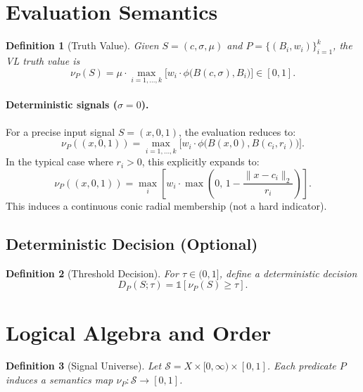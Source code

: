 \documentclass[11pt]{article}
\newtheorem{definition}{Definition}
\newcommand{\bbone}{\mathbb{1}}
\begin{document}
\section{Evaluation Semantics}

\begin{definition}[Truth Value]
Given $S=(c,\sigma,\mu)$ and $P=\{(B_i,w_i)\}_{i=1}^{k}$, the VL truth value is
\begin{equation}
\nu_P(S)=\mu\cdot \max_{i=1,\dots,k}\Big[w_i\cdot \phi\big(B(c,\sigma),B_i\big)\Big]\in[0,1].
\end{equation}
\end{definition}

\paragraph{Deterministic signals ($\sigma=0$).}
For a precise input signal $S=(x,0,1)$, the evaluation reduces to:
\begin{equation}
\nu_P((x,0,1))= \max_{i=1,\dots,k}\Big[w_i\cdot \phi\big(B(x,0), B(c_i, r_i)\big)\Big].
\end{equation}
In the typical case where $r_i > 0$, this explicitly expands to:
\begin{equation}
\nu_P((x,0,1))=\max_{i}\left[w_i\cdot \max\!\left(0,\,1-\frac{\|x-c_i\|_2}{r_i}\right)\right].
\end{equation}
This induces a continuous conic radial membership (not a hard indicator).

\subsection{Deterministic Decision (Optional)}
\begin{definition}[Threshold Decision]
For $\tau\in(0,1]$, define a deterministic decision
\begin{equation}
D_P(S;\tau)=\bbone[\nu_P(S)\ge \tau].
\end{equation}
\end{definition}

\section{Logical Algebra and Order}

\begin{definition}[Signal Universe]
Let $\mathcal{S}=X\times[0,\infty)\times[0,1]$. Each predicate $P$ induces a semantics map $\nu_P:\mathcal{S}\to[0,1]$.
\end{definition}
\end{document}
